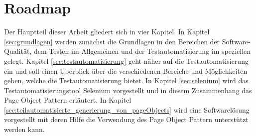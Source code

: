 \section{Roadmap}
\label{roadmap}
Der Hauptteil dieser Arbeit gliedert sich in vier Kapitel. In Kapitel \ref{sec:grundlagen} werden zunächst die Grundlagen in den Bereichen der Software-Qualität, dem Testen im Allgemeinen und der Testautomatisierung im speziellen gelegt.
Kapitel \ref{sec:testautomatisierung} geht näher auf die Testautomatisierung ein und soll einen Überblick über die verschiedenen Bereiche und Möglichkeiten geben, welche die Testautomatisierung bietet.
In Kapitel \ref{sec:selenium} wird das Testautomatisierungstool Selenium vorgestellt und in diesem Zusammenhang das Page Object Pattern erläutert.
In Kapitel \ref{sec:teilautomatisierte_generierung_von_pageObjects} wird eine Softwarelösung vorgestellt mit deren Hilfe die Verwendung des Page Object Pattern unterstützt werden kann.

  




